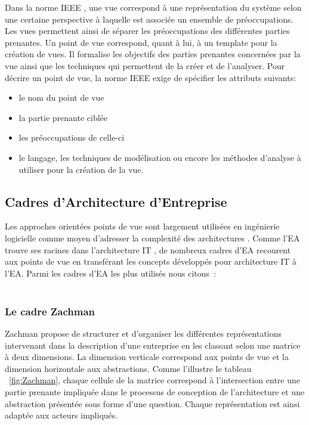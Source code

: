 Dans la norme IEEE \cite{hilliard2000ieee}, une vue correspond à une
représentation du système selon une certaine perspective à laquelle est
associée un ensemble de préoccupations. Les vues permettent ainsi de séparer
les préoccupations des différentes parties prenantes. Un point de vue
correspond, quant à lui, à un template pour la création de vues. Il formalise
les objectifs des parties prenantes concernées par la vue ainsi que les
techniques qui permettent de la créer et de l'analyser. Pour décrire un point
de vue, la norme IEEE \cite{hilliard2000ieee} exige de spécifier les
attributs suivants: \begin{itemize} \item le nom du point de vue \item la
partie prenante ciblée \item les préoccupations de celle-ci \item le langage,
les techniques de modélisation ou encore les méthodes d'analyse à utiliser pour
la création de la vue.  \end{itemize}

\subsection{Cadres d'Architecture d'Entreprise}

Les approches orientées points de vue sont largement utilisées en ingénierie
logicielle comme moyen d'adresser la complexité des architectures
\cite{steen2004supporting}. Comme l'EA trouve ses racines dans l'architecture
IT \cite{winter2008enterprise}, de nombreux cadres d'EA recourent aux points de
vue en transférant les concepts développés pour architecture IT à l'EA. Parmi
les cadres d'EA les plus utilisés nous citons~: \\\

\subsubsection{Le cadre Zachman}

Zachman \cite{zachman1987framework} propose de structurer et d'organiser les
différentes représentations intervenant dans la description d'une entreprise en
les classant selon une matrice à deux dimensions. La dimension verticale
correspond aux points de vue et la dimension horizontale aux abstractions.
Comme l'illustre le tableau ~\ref{fig:Zachman}, chaque cellule de la matrice
correspond à l'intersection entre une partie prenante impliquée dans le
processus de conception de l'architecture et une abstraction présentée sous
forme d'une question. Chaque représentation est ainsi adaptée aux acteurs
impliqués. 

